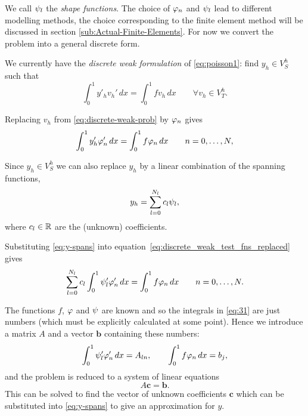 We call $\psi_l$ the \emph{shape functions}. The choice of $\varphi_{n}$
and $\psi_l$ lead to different modelling methods, the choice corresponding
to the finite element method will be discussed in section \ref{sub:Actual-Finite-Elements}. For now we convert the problem into a general discrete form.

We currently have the \emph{discrete weak formulation} of \eqref{eq:poisson1}: find $y_{h}\in V_{S}^{h}$ such that
\begin{equation}
  \int_{0}^{1}y'_{h}v_{h}'\, dx=\int_{0}^{1}fv_{h}\, dx\qquad\forall v_{h}\in V_{T}^{h}.
  \label{eq:discrete-weak-prob}
\end{equation}

Replacing $v_{h}$ from \eqref{eq:discrete-weak-prob} by $\varphi_{n}$
gives
\begin{equation}
  \int_{0}^{1} y'_{h} \varphi_{n}' \, dx = \int_{0}^{1}f\varphi_{n}\, dx\qquad n=0,\ldots,N,
  \label{eq:discrete_weak_test_fns_replaced}
\end{equation}

Since $y_{h}\in V_{S}^{h}$ we can also replace $y_{h}$ by a linear combination
of the spanning functions, \ie
\begin{equation}
  y_{h}=\sum_{l=0}^{N_l}c_{l}\psi_{l},
  \label{eq:y-spans}
\end{equation}
where $c_l \in \mathbb{R}$ are the (unknown) coefficients.

Substituting \eqref{eq:y-spans} into equation~\eqref{eq:discrete_weak_test_fns_replaced} gives
\begin{equation}
  \sum_{l=0}^{N_l}c_{l}\int_{0}^{1}\psi_{l}'\varphi'_{n}\, dx=\int_{0}^{1}f\varphi_{n}\, dx
  \qquad n=0,\ldots,N.
  \label{eq:31}
\end{equation}

The functions $f$, $\varphi$ and $\psi$ are known and so the integrals in \eqref{eq:31} are just numbers (which must be explicitly calculated at some point). Hence we introduce a matrix $A$ and a vector $\mathbf{b}$ containing these numbers:
\begin{equation}
  \int_{0}^{1}\psi_{l}'\varphi'_{n}\, dx=A_{ln},\qquad\int_{0}^{1}f\varphi_{n}\, dx=b_{j},\label{eq:Aij_bj}
\end{equation}
and the problem is reduced to a system of linear equations
\begin{equation}
  A\mathbf{c} = \mathbf{b}.
  \label{eq:final_galerkin}
\end{equation}
This can be solved to find the vector of unknown coefficients $\mathbf{c}$ which can be substituted into \eqref{eq:y-spans} to give an approximation for $y$.


